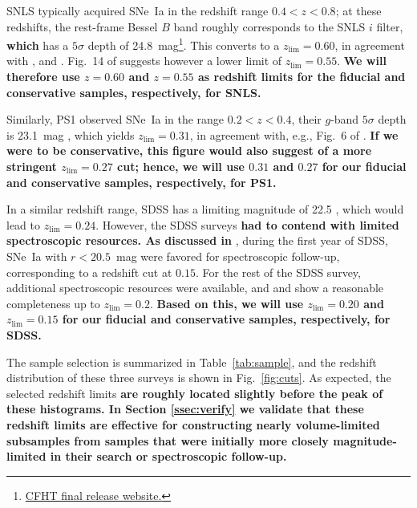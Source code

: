 \documentclass[]{aa}
\begin{document}
SNLS typically acquired SNe~Ia in the redshift range $0.4<z<0.8$; at these
redshifts, the rest-frame Bessel $B$ band roughly corresponds to the SNLS $i$
filter, \textbf{which} has a $5\sigma$ depth of
24.8~mag\footnote{\href{https://www.cfht.hawaii.edu/Science/CFHTLS/cfhtlsfinalreleaseexecsummary.html}{CFHT
final release website.}}. This converts to a $z_{\lim}=0.60$, in agreement with
\cite{neill2006}, \cite{perrett2010} and \cite{bazin2011}. Fig.~14 of
\citet[][see their Section~5]{perrett2010} suggests however a lower limit of
$z_{\lim}=0.55$. \textbf{We will therefore use $z=0.60$ and $z=0.55$ as redshift
limits for the fiducial and conservative samples, respectively, for SNLS.}

Similarly, PS1 observed SNe~Ia in the range $0.2<z<0.4$, their $g$-band
$5\sigma$ depth is 23.1~mag \citep{rest2014}, which yields $z_{\lim}=0.31$, in
agreement with, e.g., Fig.~6 of \cite{scolnic2018a}. \textbf{If we were to be
    conservative, this figure would also suggest of a more stringent
$z_{\lim}=0.27$ cut; hence, we will use $0.31$ and $0.27$ for our fiducial and
conservative samples, respectively, for PS1.}

In a similar redshift range, SDSS has a limiting magnitude of 22.5
\citep{dilday2008, sako2008}, which would lead to $z_{\lim}=0.24$. However, the
SDSS surveys \textbf{had to contend with limited spectroscopic resources. As
discussed in} \citet[][Section~2]{kessler2009}, during the first year of SDSS,
SNe~Ia with $r<20.5$~mag were favored for spectroscopic follow-up, corresponding
to a redshift cut at $0.15$. For the rest of the SDSS survey, additional
spectroscopic resources were available, and \cite{kessler2009} and
\cite{dilday2008} show a reasonable completeness up to $z_{\lim}=0.2$.
\textbf{Based on this, we will use $z_{\lim}=0.20$ and $z_{\lim}=0.15$ for our
fiducial and conservative samples, respectively, for SDSS.}

The sample selection is summarized in Table~\ref{tab:sample}, and the redshift
distribution of these three surveys is shown in Fig.~\ref{fig:cuts}. As
expected, the selected redshift limits \textbf{are roughly located slightly
    before the peak of these histograms. In Section \ref{ssec:verify} we
validate that these redshift limits are effective for constructing nearly
volume-limited subsamples from samples that were initially more closely
magnitude-limited in their search or spectroscopic follow-up.}
\end{document}

